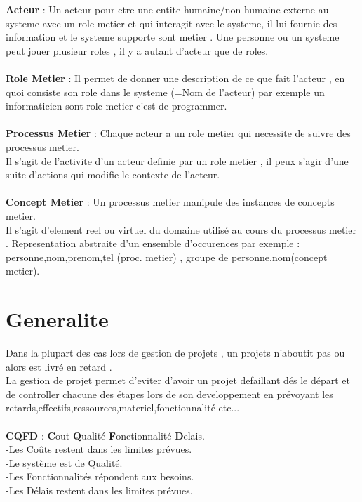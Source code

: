 \documentclass[a4paper,12pt,openany]{book}
\begin{document}
\textbf{Acteur} : Un acteur pour etre une entite humaine/non-humaine externe au systeme avec un role metier et qui interagit avec le systeme, il lui fournie des information et le systeme supporte sont metier . Une personne ou un systeme peut jouer plusieur roles , il y a autant d'acteur que de roles.\\
\\
\textbf{Role Metier} : Il permet de donner une description de ce que fait l'acteur , en quoi consiste son role dans le systeme (=Nom de l'acteur) par exemple un informaticien sont role metier c'est de programmer.\\
\\
\textbf{Processus Metier} : Chaque acteur a un role metier qui necessite de suivre des processus metier.\\
Il s'agit de l'activite d'un acteur definie par un role metier , il peux s'agir d'une suite d'actions qui modifie le contexte de l'acteur.\\
\\
\textbf{Concept Metier} : Un processus metier manipule des instances de concepts metier.\\
Il s'agit d'element reel ou virtuel du domaine utilis\'e au cours du processus metier . Representation abstraite d'un ensemble d'occurences par exemple : personne,nom,prenom,tel (proc. metier) , groupe de personne,nom(concept metier).\\


\section{Generalite}

Dans la plupart des cas lors de gestion de projets , un projets n'aboutit pas ou alors est livré en retard .\\
La gestion de projet permet d'eviter d'avoir un projet defaillant dés le départ et de controller chacune des étapes lors de son developpement en prévoyant les retards,effectifs,ressources,materiel,fonctionnalité etc...\\
\\
\textbf{CQFD} : \textbf{C}out \textbf{Q}ualité \textbf{F}onctionnalité \textbf{D}elais.\\
-Les Coûts restent dans les limites prévues.\\
-Le système est de Qualité.\\
-Les Fonctionnalités répondent aux besoins.\\
-Les Délais restent dans les limites prévues.\\
\\
\end{document}
